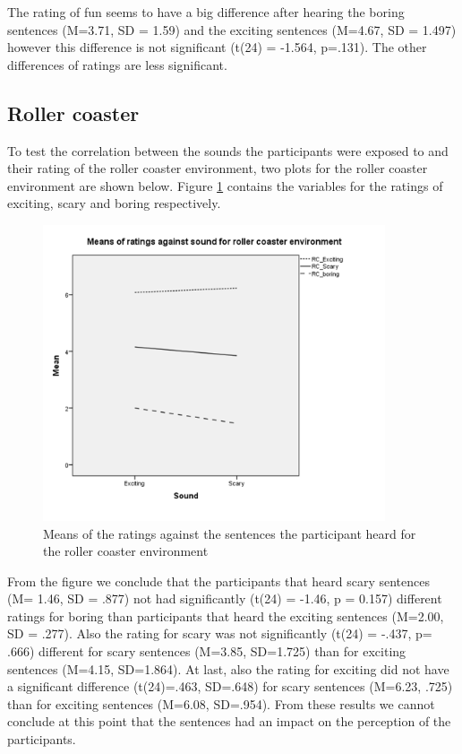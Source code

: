 \documentclass[Results.tex]{subfiles}
\begin{document}
The rating of fun seems to have a big difference after hearing the boring sentences (M=3.71, SD = 1.59) and the exciting sentences (M=4.67, SD = 1.497) however this difference is not significant (t(24) = -1.564, p=.131). The other differences of ratings are less significant.

\subsection{Roller coaster}
To test the correlation between the sounds the participants were exposed to and their rating of the roller coaster environment, two plots for the roller coaster environment are shown below. Figure \ref{fig:Ratings_sound_RC} contains the variables for the ratings of exciting, scary and boring respectively.

\begin{figure}[H]
	\centering
		\includegraphics[width=0.90\textwidth]{Section_1/Figures/Ratings_sound_RC.png}
	\caption{Means of the ratings against the sentences the participant heard for the roller coaster environment}
	\label{fig:Ratings_sound_RC}
\end{figure}

From the figure we conclude that the participants that heard scary sentences (M= 1.46, SD = .877) not had significantly (t(24) = -1.46, p = 0.157) different ratings for boring than participants that heard the exciting sentences (M=2.00, SD = .277). Also the rating for scary was not significantly (t(24) = -.437, p= .666) different for scary sentences (M=3.85, SD=1.725) than for exciting sentences (M=4.15, SD=1.864). At last, also the rating for exciting did not have a significant difference (t(24)=.463, SD=.648) for scary sentences (M=6.23, .725) than for exciting sentences (M=6.08, SD=.954). From these results we cannot conclude at this point that the sentences had an impact on the perception of the participants. \\
\end{document}
